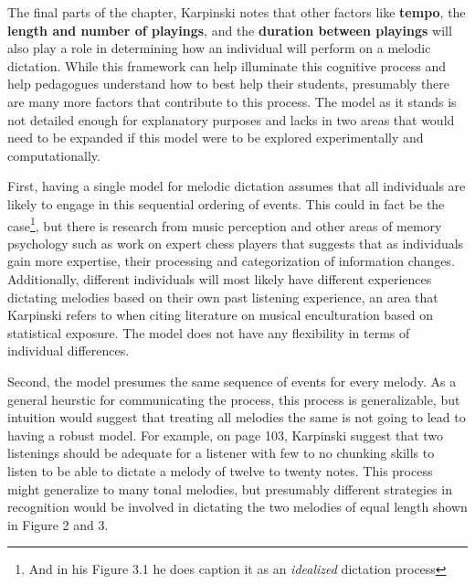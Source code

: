 \documentclass[]{book}
\let\rmarkdownfootnote\footnote%
\def\footnote{\protect\rmarkdownfootnote}
\theoremstyle{definition}
\theoremstyle{definition}
\theoremstyle{definition}
\theoremstyle{remark}
\begin{document}
The final parts of the chapter, Karpinski notes that other factors like
\textbf{tempo}, the \textbf{length and number of playings}, and the
\textbf{duration between playings} will also play a role in determining
how an individual will perform on a melodic dictation. While this
framework can help illuminate this cognitive process and help pedagogues
understand how to best help their students, presumably there are many
more factors that contribute to this process. The model as it stands is
not detailed enough for explanatory purposes and lacks in two areas that
would need to be expanded if this model were to be explored
experimentally and computationally.

First, having a single model for melodic dictation assumes that all
individuals are likely to engage in this sequential ordering of events.
This could in fact be the case\footnote{And in his Figure 3.1 he does
  caption it as an \emph{idealized} dictation process}, but there is
research from music perception
\citep{goldmanImprovisationExperiencePredicts2018a} and other areas of
memory psychology such as work on expert chess players
\citep{laneChessKnowledgePredicts2018} that suggests that as individuals
gain more expertise, their processing and categorization of information
changes. Additionally, different individuals will most likely have
different experiences dictating melodies based on their own past
listening experience, an area that Karpinski refers to when citing
literature on musical enculturation based on statistical exposure. The
model does not have any flexibility in terms of individual differences.

Second, the model presumes the same sequence of events for every melody.
As a general heurstic for communicating the process, this process is
generalizable, but intuition would suggest that treating all melodies
the same is not going to lead to having a robust model. For example, on
page 103, Karpinski suggest that two listenings should be adequate for a
listener with few to no chunking skills to listen to be able to dictate
a melody of twelve to twenty notes. This process might generalize to
many tonal melodies, but presumably different strategies in recognition
would be involved in dictating the two melodies of equal length shown in
Figure 2 and 3.
\end{document}
